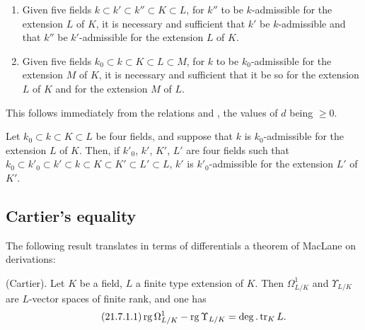 \begin{corollary}[21.6.5]
\label{0.21.6.5}
\begin{enumerate}
  \item[\rm (i)] Given five fields $k\subset k'\subset k''\subset K\subset L$, for $k''$ to be $k$-admissible for the extension $L$ of $K$, it is necessary and sufficient that $k'$ be $k$-admissible and that $k''$ be $k'$-admissible for the extension $L$ of $K$.
  \item[\rm (ii)] Given five fields $k_0\subset k\subset K\subset L\subset M$, for $k$ to be $k_0$-admissible for the extension $M$ of $K$, it is necessary and sufficient that it be so for the extension $L$ of $K$ and for the extension $M$ of $L$.
\end{enumerate}
\end{corollary}

This follows immediately from the relations  and , the values of $d$ being $\geqslant 0$.

\begin{corollary}[21.6.6]
\label{0.21.6.6}
Let $k_0\subset k\subset K\subset L$ be four fields, and suppose that $k$ is $k_0$-admissible for the extension $L$ of $K$.
Then, if $k'_0$, $k'$, $K'$, $L'$ are four fields such that $k_0\subset k'_0\subset k'\subset k\subset K\subset K'\subset L'\subset L$, $k'$ is $k'_0$-admissible for the extension $L'$ of $K'$.
\end{corollary}

\subsection{Cartier's equality}
\label{subsection:0.21.7}

The following result translates in terms of differentials a theorem of MacLane on derivations:

\begin{theorem}[21.7.1]
\label{0.21.7.1}
\textnormal{(Cartier).}
Let $K$ be a field, $L$ a finite type extension of $K$.
Then $\Omega^1_{L/K}$ and $\Upsilon_{L/K}$ are $L$-vector spaces of finite rank, and one has
\begin{equation}
\tag{21.7.1.1}
  \label{0.21.7.1.1}
  \operatorname{rg}\Omega^1_{L/K}-\operatorname{rg}\Upsilon_{L/K}=\deg.\operatorname{tr}_K L.
\end{equation}
\end{theorem}

